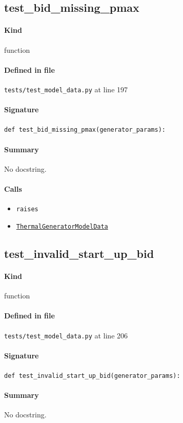 \documentclass[11pt]{report}
\begin{document}
\subsection{test\_bid\_missing\_pmax}
\label{def:tests-test_model_data.py:test_bid_missing_pmax:L197}
\paragraph{Kind} function
\paragraph{Defined in file} \texttt{tests/test\_model\_data.py} at line 197
\paragraph{Signature} \texttt{def test\_bid\_missing\_pmax(generator\_params):}
\paragraph{Summary} No docstring.
\paragraph{Calls}
\begin{itemize}[leftmargin=*]
  \item \texttt{raises}
  \item \hyperref[def:model_data.py:ThermalGeneratorModelData:L185]{\texttt{ThermalGeneratorModelData}}
\end{itemize}
\subsection{test\_invalid\_start\_up\_bid}
\label{def:tests-test_model_data.py:test_invalid_start_up_bid:L206}
\paragraph{Kind} function
\paragraph{Defined in file} \texttt{tests/test\_model\_data.py} at line 206
\paragraph{Signature} \texttt{def test\_invalid\_start\_up\_bid(generator\_params):}
\paragraph{Summary} No docstring.
\end{document}
